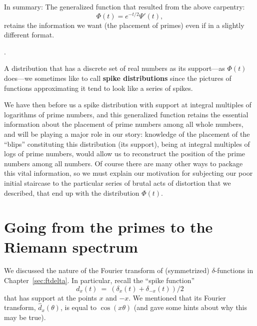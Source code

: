 \documentclass[openany]{book}
\theoremstyle{plain}
\theoremstyle{definition}
\newcommand{\todo}[1]{\par\vspace{1em}{\small---------\\{{\bf To be done:} #1}\\-----------}\par\vspace{1em}}
\begin{document}
{{%


In summary: The generalized function that resulted from the above carpentry:
  $$\Phi(t) = e^{-t/2}\Psi'(t),$$ retains the information we want (the placement of primes) even if in a slightly different format.
}.%


A distribution that has a discrete set of real numbers as its
  support---as $\Phi(t)$ does---we sometimes like to call {\bf spike
    distributions} since the pictures of functions approximating it
  tend to look like a series of spikes.

  We have then before us a spike distribution with support at integral
  multiples of logarithms of prime numbers, and this generalized
  function retains the essential information about the placement of
  prime numbers among all whole numbers, and will be playing a major
  role in our story: knowledge of the placement of the ``blips'' constituting this distribution (its
support), being at  integral multiples of logs of prime numbers, would allow us to reconstruct the position of the prime
numbers among all numbers. Of course there are many other ways to package this vital information, so we
must explain our motivation for subjecting our poor initial staircase
to the particular series of brutal acts of distortion that we
described, that end up with the distribution $\Phi(t)$.







\chapter[From primes to the Riemann spectrum]{Going from
the primes to the Riemann spectrum}
\label{ch:prime-to-spectrum}



We  discussed the nature of the Fourier transform of (symmetrized)
$\delta$-functions in Chapter~\ref{sec:ftdelta}. In particular, recall
the ``spike function'' $$d_x(t) \ = \ (\delta_x(t) +
\delta_{-x}(t))/2$$ that has support at the points $x$ and $-x$.  We
mentioned that its Fourier transform, ${\hat d}_x(\theta)$, is equal
to $\cos(x\theta)$ (and gave some hints about why this may be true).


}
\end{document}
